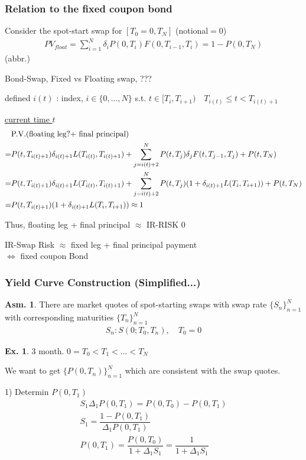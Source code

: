 \documentclass[a4paper,11pt]{jsarticle}
\theoremstyle{definition}
\newtheorem{ex}{Ex.}[subsection]
\newtheorem{asm}{Asm.}[subsection]
\newcommand{\df}[2]{\dfrac{#1}{#2}}
\begin{document}
\subsubsection{Relation to the fixed coupon bond}
Consider the spot-start swap for $[T_0=0, T_N]$ (notional$=0$)
\begin{align}
  PV_{float}=\sum_{i=1}^N \delta_i P(0,T_i)F(0,T_{i-1},T_i)
  =1-P(0,T_N)
\end{align}
(abbr.)


Bond-Swap, Fixed vs Floating swap, 
???

defined $i(t)$ : index, $i\in\{0,...,N\} $
s.t. $t\in[T_i,T_{i+1}) \quad T_{i(t)}\leq t < T_{i(t)+1}$

\underline{current time $t$}
\begin{align}
  &\mbox{P.V.(floating leg?+ final principal)} \notag \\
  =&P(t,T_{i(t)+1})\delta_{i(t)+1}L(T_{i(t)},T_{i(t)+1})
  +\sum_{j=i(t)+2}^N P(t,T_j)\delta_j F(t,T_{j-1},T_j)
  +P(t,T_N) \notag \\
  =&P(t,T_{i(t)+1})\delta_{i(t)+1}L(T_{i(t)},T_{i(t)+1})
  +\sum_{j=i(t)+2}^N P(t,T_j)(1+\delta_{i(t)+1}L(T_i,T_{i+1}))
  +P(t,T_N) \notag \\
  =&P(t,T_{i(t)+1})(1+\delta_{i(t)+1}L(T_i,T_{i+1}))
  \approx 1
\end{align}

Thus, floating leg + final principal $\approx$ IR-RISK $0$

IR-Swap Risk $\approx$ fixed leg + final principal payment \\
$\Leftrightarrow$ fixed coupon Bond


\subsubsection{Yield Curve Construction (Simplified...)}
\begin{asm}
  There are market quotes of spot-starting swaps with swap rate
  $\{S_n\}_{n=1}^N$ with corresponding maturities $\{T_n\}_{n=1}^N$
  \begin{align}
    S_n:S(0;T_0,T_n), \quad T_0=0
  \end{align}
\end{asm}


\begin{ex}
  3 month. $0=T_0<T_1<...<T_N$
\end{ex}
We want to get $\{P(0,T_n)\}_{n=1}^N$ which are consistent with
the swap quotes.

1) Determin $P(0,T_1)$
\begin{align}
  S_1 \Delta_1 P(0,T_1)=P(0,T_0)-P(0,T_1) \\
  S_1 = \df{1-P(0,T_1)}{\Delta_1 P(0,T_1)} \\
  P(0,T_1)=\df{P(0,T_0)}{1+\Delta_1 S_1}=\df{1}{1+\Delta_1 S_1}
\end{align}
\end{document}
